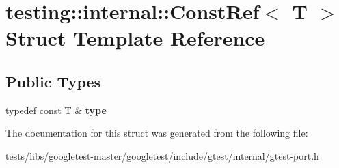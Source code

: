 \hypertarget{structtesting_1_1internal_1_1ConstRef}{}\section{testing\+:\+:internal\+:\+:Const\+Ref$<$ T $>$ Struct Template Reference}
\label{structtesting_1_1internal_1_1ConstRef}
\subsection*{Public Types}
\begin{DoxyCompactItemize}
\item 
\mbox{\label{structtesting_1_1internal_1_1ConstRef_a53610a4d0e72958332222b0a85f8937a}} 
typedef const T \& {\bfseries type}
\end{DoxyCompactItemize}


The documentation for this struct was generated from the following file\+:\begin{DoxyCompactItemize}
\item 
tests/libs/googletest-\/master/googletest/include/gtest/internal/gtest-\/port.\+h\end{DoxyCompactItemize}
